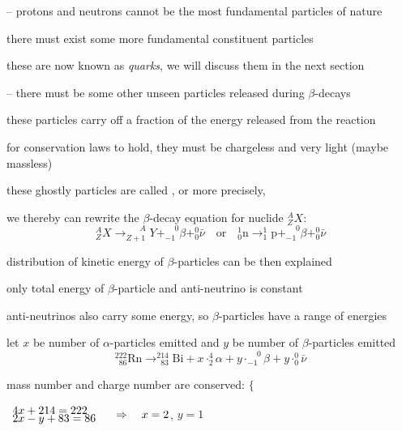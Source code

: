 \begin{compactenum}
	\item[--] protons and neutrons cannot be the most fundamental particles of nature
	
	there must exist some more fundamental constituent particles
	
	these are now known as \emph{quarks}, we will discuss them in the next section
	
	\item[--] there must be some other unseen particles released during $\beta$-decays
	
	these particles carry off a fraction of the energy released from the reaction
	
	for conservation laws to hold, they must be chargeless and very light (maybe massless)
	
	these ghostly particles are called , or more precisely, 
\end{compactenum}

\cmt we thereby can rewrite the $\beta$-decay equation for nuclide $_Z^A X$:
\begin{equation*}
\boxed{_Z^A X \longrightarrow _{Z+1}^{\phantom{1+}A} Y + _{-1}^{\phantom{+}0}\beta + _0^0 \bar{\nu}} \quad \text{or} \quad \boxed{_0^1 \text{n} \longrightarrow _1^1 \text{p} + _{-1}^{\phantom{+}0}\beta + _0^0 \bar{\nu}} \label{eqn:beta-decay}
\end{equation*}

\cmt distribution of kinetic energy of $\beta$-particles can be then explained

only total energy of $\beta$-particle and anti-neutrino is constant

anti-neutrinos also carry some energy, so $\beta$-particles have a range of energies


\begin{soln} let $x$ be number of $\alpha$-particles emitted and $y$ be number of $\beta$-particles emitted
\begin{equation*}
	^{222}_{\phantom{2}86}\text{Rn} \longrightarrow ^{214}_{\phantom{2}83}\text{Bi} + x \cdot ^4_2 \alpha + y \cdot _{-1}^{\phantom{+}0}\beta + y \cdot _0^0 \bar{\nu}
\end{equation*}

\eqyskip mass number and charge number are conserved: $\Bigg\{$

\vspace*{-1.58\baselineskip}\hspace*{218pt} $\begin{array}{l}
4x + 214 = 222\\[-5pt]
2x - y + 83 = 86
\end{array} \quad \Rightarrow \quad x = 2$, $y=1$ \end{soln}



